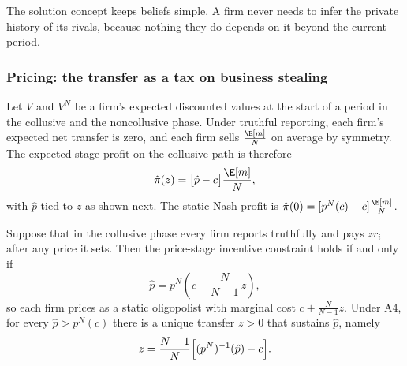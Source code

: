 The solution concept keeps beliefs simple. A firm never needs to infer the private history of its rivals, because
nothing they do depends on it beyond the current period.

\subsubsection{Pricing: the transfer as a tax on business stealing}

Let $V$ and $V^N$ be a firm's expected discounted values at the start of a period in the collusive and the
noncollusive phase. Under truthful reporting, each firm's expected net transfer is zero, and each firm sells
$\frac{\E[m]}{N}$ on average by symmetry. The expected stage profit on the collusive path is therefore
\begin{equation}\label{eq:12-hs-pihat}
  \hat\pi(z) = \bigl[\hat p - c\bigr]\frac{\E[m]}{N},
\end{equation}
with $\hat p$ tied to $z$ as shown next. The static Nash profit is $\hat\pi(0) = [p^N(c) - c]\frac{\E[m]}{N}$.

\begin{proposition}\label{prop:12-hs-cost}
Suppose that in the collusive phase every firm reports truthfully and pays $z r_i$ after any price it sets. Then
the price-stage incentive constraint holds if and only if
\begin{equation}\label{eq:12-hs-price}
  \hat p = p^N\!\left(c + \frac{N}{N-1}\,z\right),
\end{equation}
so each firm prices as a static oligopolist with marginal cost $c + \frac{N}{N-1}z$. Under A4, for every
$\hat p > p^N(c)$ there is a unique transfer $z > 0$ that sustains $\hat p$, namely
\begin{equation}\label{eq:12-hs-z}
  z = \frac{N-1}{N}\Bigl[(p^N)^{-1}(\hat p) - c\Bigr] .
\end{equation}
\end{proposition}


